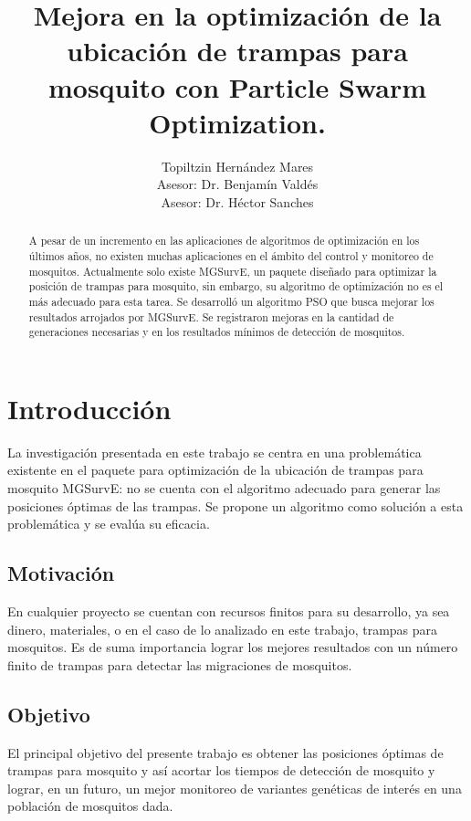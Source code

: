 \documentclass[letterpaper]{report}
\title{\bf
  Mejora en la optimización de la ubicación de trampas para mosquito con
  Particle Swarm Optimization.
}
\author{
  Topiltzin Hernández Mares \\
  [1cm]{\small Asesor: Dr. Benjamín Valdés}\\
  \small Asesor: Dr. Héctor Sanches
}
\begin{document}
\maketitle
\thispagestyle{empty}
\pagestyle{empty}
\tableofcontents
\listoffigures
\listoftables

\begin{abstract}
  A pesar de un incremento en las aplicaciones de algoritmos de optimización en
  los últimos años, no existen muchas aplicaciones en el ámbito del control y
  monitoreo de mosquitos. Actualmente solo existe MGSurvE, un paquete diseñado
  para optimizar la posición de trampas para mosquito, sin embargo, su algoritmo
  de optimización no es el más adecuado para esta tarea. Se desarrolló un
  algoritmo PSO que busca mejorar los resultados arrojados por MGSurvE. Se
  registraron mejoras en la cantidad de generaciones necesarias y en los
  resultados mínimos de detección de mosquitos. 
\end{abstract}

\chapter{Introducción}

  La investigación presentada en este trabajo se centra en una problemática
  existente en el paquete para optimización de la ubicación de trampas para
  mosquito MGSurvE: no se cuenta con el algoritmo adecuado para generar las
  posiciones óptimas de las trampas. Se propone un algoritmo como solución a
  esta problemática y se evalúa su eficacia. 

  \section{Motivación}

  En cualquier proyecto se cuentan con recursos finitos para su desarrollo, ya
  sea dinero, materiales, o en el caso de lo analizado en este trabajo, trampas
  para mosquitos. Es de suma importancia lograr los mejores resultados con un
  número finito de trampas para detectar las migraciones de mosquitos.

  \section{Objetivo}

  El principal objetivo del presente trabajo es obtener las posiciones óptimas
  de trampas para mosquito y así acortar los tiempos de detección de mosquito y
  lograr, en un futuro, un mejor monitoreo de variantes genéticas de interés en
  una población de mosquitos dada.
\end{document}
